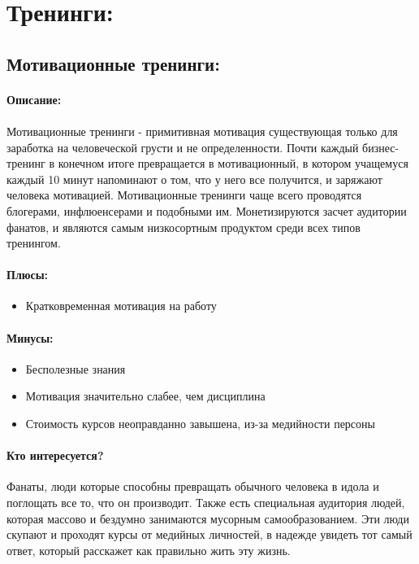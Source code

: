 \documentclass{article}
\begin{document}
\newpage

\section{Тренинги:}
\subsection{Мотивационные тренинги:}
\paragraph{\textbf{Описание:}}
\paragraph{}
Мотивационные тренинги - примитивная мотивация существующая только для заработка на человеческой грусти и не определенности. Почти каждый бизнес-тренинг в конечном итоге превращается в мотивационный, в котором учащемуся каждый 10 минут напоминают о том, что у него все получится, и заряжают человека мотивацией. Мотивационные тренинги чаще всего проводятся блогерами, инфлюенсерами и подобными им. Монетизируются засчет аудитории фанатов, и являются самым низкосортным продуктом среди всех типов тренингом.
\paragraph{\textbf{Плюсы:}}
\begin{itemize}
    \item Кратковременная мотивация на работу
\end{itemize}
\paragraph{\textbf{Минусы:}}
\begin{itemize}
    \item Бесполезные знания
    \item Мотивация значительно слабее, чем дисциплина
    \item Стоимость курсов неоправданно завышена, из-за медийности персоны
\end{itemize}
\paragraph{\textbf{Кто интересуется?}}
Фанаты, люди которые способны превращать обычного человека в идола и поглощать все то, что он производит. Также есть специальная аудитория людей, которая массово и бездумно занимаются мусорным самообразованием. Эти люди скупают и проходят курсы от медийных личностей, в надежде увидеть тот самый ответ, который расскажет как правильно жить эту жизнь. 
\end{document}
